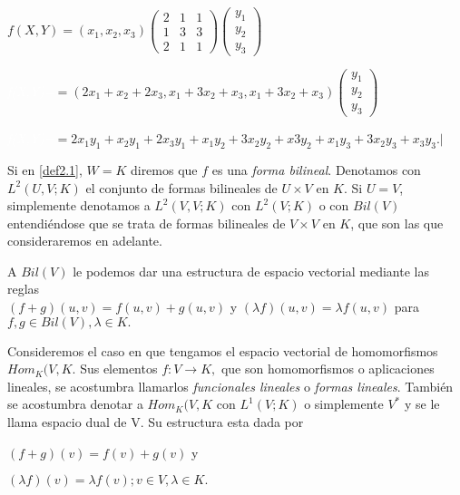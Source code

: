 			$f(X,Y) = (x_{1}, x_{2}, x_{3})\left(\begin{matrix}
			2 & 1 & 1 \\ 1 & 3 & 3 \\ 2 & 1 & 1 
			\end{matrix}\right)\left(\begin{matrix}
				y_{1} \\ y_{2} \\ y_{3}
			\end{matrix}\right)	
			$
			
			 \textcolor{white}{\textit{f(X,Y)=}}$=(2x_{1} + x_{2} + 2x_{3}, x_{1} + 3x_{2} + x_{3}, x_{1} + 3x_{2} + x_{3})\left(\begin{matrix}
			 y_{1} \\ y_{2} \\ y_{3}
			 \end{matrix}\right)
			$
		
			\textcolor{white}{\textit{f(X,Y)=}}$ =2x_{1}y_{1} + x_{2}y_{1} + 2x_{3}y_{1} + x_{1}y_{2} + 3x_{2}y_{2} + x3y_{2} + x_{1}y_{3} + 3x_{2}y_{3} + x_{3}y_{3}.| $
			
			Si en \ref{def2.1}, $ W = K $ diremos que $ f $ es una \textit{forma bilineal}. Denotamos con $ L^{2}(U, V ;K) $ el conjunto de formas bilineales de $ U \times V $ en $ K $. Si $ U = V $, simplemente denotamos a $ L^{2}(V, V ;K) $ con $ L^{2}(V ;K) $ o con $ Bil(V) $ entendiéndose que
			se trata de formas bilineales de $ V \times V $ en $ K $, que son las que consideraremos en adelante.
			
			A $ Bil(V) $ le podemos dar una estructura de espacio vectorial mediante las reglas \\
		$ (f+g)(u,v) = f(u,v) + g(u,v) $ y $(\lambda f)(u,v) = \lambda f(u, v)$ para $f, g \in Bil(V), \lambda \in K. $
		
		Consideremos el caso en que tengamos el espacio vectorial de homomorfismos $ Hom_{K}(V,K $. Sus elementos $ f:V \rightarrow K, $ que son homomorfismos o aplicaciones lineales, se acostumbra llamarlos \textit{funcionales lineales} o \textit{formas lineales}. También se acostumbra denotar a $ Hom_{K}(V,K $ con $ L^{1}(V;K) $ o simplemente $ V^{*} $ y se le llama espacio dual de V. Su estructura esta dada por
		
		\begin{center}
			$ (f + g)(v) = f(v) + g(v)$  y 
			
		$ (\lambda f)(v) = \lambda f(v); v \in V,\lambda \in K. $
		\end{center}
		
